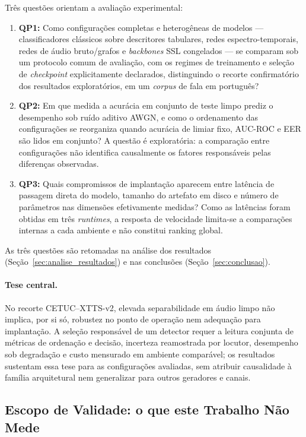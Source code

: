 \documentclass[12pt,a4paper]{article}
\begin{document}
Três questões orientam a avaliação experimental:
\begin{enumerate}
	\item \textbf{QP1:} Como configurações completas e heterogêneas de modelos ---
	classificadores clássicos sobre descritores tabulares, redes
	espectro-temporais, redes de áudio bruto/grafos e \textit{backbones} SSL
	congelados --- se comparam sob um protocolo comum de avaliação, com os
	regimes de treinamento e seleção de \textit{checkpoint} explicitamente
	declarados, distinguindo o recorte confirmatório dos resultados exploratórios,
	em um \textit{corpus} de fala em português?
	\item \textbf{QP2:} Em que medida a acurácia em conjunto de teste limpo
	prediz o desempenho sob ruído aditivo AWGN, e como o ordenamento das
	configurações se reorganiza quando acurácia de limiar fixo, AUC-ROC e EER são
	lidos em conjunto? A questão é exploratória: a comparação entre configurações
	não identifica causalmente os fatores responsáveis pelas diferenças observadas.
	\item \textbf{QP3:} Quais compromissos de implantação aparecem entre
	latência de passagem direta do modelo, tamanho do artefato em disco e
	número de parâmetros nas dimensões efetivamente medidas? Como as latências
	foram obtidas em três \textit{runtimes}, a resposta de velocidade limita-se a
	comparações internas a cada ambiente e não constitui ranking global.
\end{enumerate}
As três questões são retomadas na análise dos resultados
(Seção~\ref{sec:analise_resultados}) e nas conclusões
(Seção~\ref{sec:conclusao}).

\paragraph{Tese central.} No recorte CETUC--XTTS-v2, elevada separabilidade em
áudio limpo não implica, por si só, robustez no ponto de operação nem adequação
para implantação. A seleção responsável de um detector requer a leitura conjunta
de métricas de ordenação e decisão, incerteza reamostrada por locutor, desempenho
sob degradação e custo mensurado em ambiente comparável; os resultados sustentam
essa tese para as configurações avaliadas, sem atribuir causalidade à família
arquitetural nem generalizar para outros geradores e canais.

\subsection{Escopo de Validade: o que este Trabalho Não Mede}
\label{sec:escopo_validade}
\end{document}
